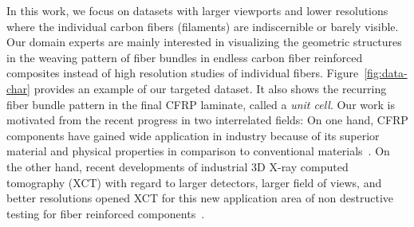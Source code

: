 In this work, we focus on datasets with larger viewports and lower resolutions where the individual carbon fibers (filaments) are indiscernible or barely visible. Our domain experts are mainly interested in visualizing the geometric structures in the weaving pattern of fiber bundles in endless carbon fiber reinforced composites instead of high resolution studies of individual fibers.
Figure~\ref{fig:data-char} provides an example of our targeted dataset. It also shows the recurring fiber bundle pattern in the final CFRP laminate, called a \textit{unit cell}.
Our work is motivated from the recent progress in two interrelated fields: On one hand, CFRP components have gained wide application in industry because of its superior material and physical properties in comparison to conventional materials~\cite{Karpat2012}. On the other hand, recent developments of industrial 3D X-ray computed tomography (XCT) with regard to larger detectors, larger field of views, and better resolutions opened XCT for this new application area of non destructive testing for fiber reinforced components~\cite{Schilling2005}. 
%
